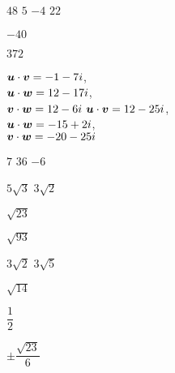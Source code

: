 
\begin{enumerate}[!HW!, start=1]
\begin{multicols}{6}
\item $48$
\itemspade $5$ %
\itemspade $-4$  %
\itemspade $22$  %
\item  $-40$
\item $372$
\end{multicols}

\begin{multicols}{2}
\itemspade $\boldsymbol u\cdot \boldsymbol v=-1-7i$,\\ $\boldsymbol u\cdot \boldsymbol w=12-17i$,\\ $\boldsymbol v\cdot \boldsymbol w = 12-6i$
\itemspade $\boldsymbol u\cdot \boldsymbol v = 12-25i$,\\ $\boldsymbol u\cdot \boldsymbol w = -15+2i$,\\ $\boldsymbol v\cdot \boldsymbol w = -20-25i$
\end{multicols}

\begin{multicols}{6}
\itemspade $7$ %
\itemspade $36$ %
\itemspade $-6$  %

\itemspade $5\sqrt{3}$ %
\itemspade $3\sqrt{2}$ %

\itemspade $\sqrt{23}$%
\end{multicols}

\begin{multicols}{6}
\itemspade $\sqrt{93}$\columnbreak%

\itemspade $3\sqrt{2}$\columnbreak %
\itemspade $3\sqrt{5}$\columnbreak %
\item $\sqrt{14}$\columnbreak %

\item $\dfrac{1}{2}$\columnbreak %
\item $\pm\dfrac{\sqrt{23}}{6}$ %
\end{multicols}
\end{enumerate}

\vspace{-15 pt}